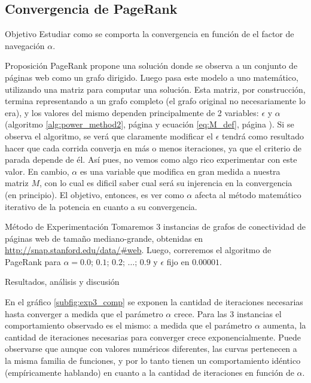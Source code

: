 \subsection{Convergencia de PageRank}
\label{subsec:exp3}
\begin{LaTeXdescription}
    \item[Objetivo] Estudiar como se comporta la convergencia en funci\'on de
        el factor de navegaci\'on $\alpha$.\\

    \item[Proposici\'on] PageRank propone una soluci\'on donde se observa a un
        conjunto de p\'aginas web como un grafo dirigido. Luego pasa este modelo
        a uno  matem\'atico, utilizando una matriz para computar una soluci\'on.
        Esta matriz, por construcci\'on, termina representando a un grafo
        completo (el grafo original no necesariamente lo era), y los valores del
        mismo dependen principalmente de 2 variables: $\epsilon$ y $\alpha$
        (algoritmo \ref{alg:power_method2}, p\'agina \pageref{alg:power_method2}
        y ecuaci\'on \ref{eq:M_def}, p\'agina \pageref{eq:M_def}). Si se observa
        el algoritmo, se ver\'a que claramente modificar el $\epsilon$ tendr\'a
        como resultado hacer que cada corrida converja en m\'as o menos
        iteraciones, ya que el criterio de parada depende de \'el. As\'i pues,
        no vemos como algo rico experimentar con este valor. En cambio, $\alpha$
        es una variable que modifica en gran medida a nuestra matriz $M$, con lo
        cual es dificil saber cual ser\'a su injerencia en la convergencia (en
        principio). El objetivo, entonces, es ver como $\alpha$ afecta al
        m\'etodo matem\'atico iterativo de la potencia en cuanto a su
        convergencia.\\

    \item[M\'etodo de Experimentaci\'on] Tomaremos 3 instancias de grafos de
        conectividad de p\'aginas web de tama\~no mediano-grande, obtenidas en
        \url{http://snap.stanford.edu/data/\#web}. Luego, correremos el
        algoritmo de PageRank para $\alpha=0.0$; $0.1$; $0.2$; $\dots$; $0.9$ y
        $\epsilon$ fijo en $0.00001$.\\

    \item[Resultados, an\'alisis y discusi\'on]
\end{LaTeXdescription}

\par En el gráfico \ref{subfig:exp3_comp} se exponen la cantidad de iteraciones
necesarias hasta converger a medida que el parámetro $\alpha$ crece. Para las 3
instancias el comportamiento observado es el mismo: a medida que el par\'ametro
$\alpha$ aumenta, la cantidad de iteraciones necesarias para converger crece
exponencialmente. Puede observarse que aunque con valores numéricos diferentes,
las curvas pertenecen a la misma familia de funciones, y por lo tanto tienen un
comportamiento id\'entico (emp\'iricamente hablando) en cuanto a la cantidad de
iteraciones en funci\'on de $\alpha$.


